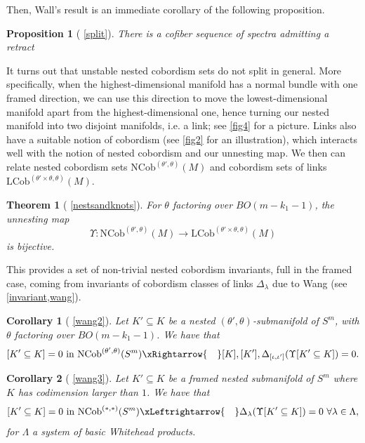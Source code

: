 \documentclass[a4paper, 11pt,reqno]{amsart}
\theoremstyle{plain}
\newtheorem*{theorem*}{Theorem}
\newtheorem*{corollary*}{Corollary}
\newtheorem*{proposition*}{Proposition}
\theoremstyle{definition}
\newcommand{\Th}{\mathrm{Th}}
\begin{document}
Then, Wall's result is an immediate corollary of the following proposition.
\begin{proposition*}[ \ref{split}] There is a cofiber sequence of spectra admitting a retract
    \begin{center}
\end{center}
\end{proposition*}
It turns out that unstable nested cobordism sets do not split in general. More specifically, when the highest-dimensional manifold has a normal bundle with one framed direction, we can use this direction to move the lowest-dimensional manifold apart from the highest-dimensional one, hence turning our nested manifold into two disjoint manifolds, i.e. a link; see \cref{fig4} for a picture. Links also have a suitable notion of cobordism (see \cref{fig2} for an illustration), which interacts well with the notion of nested cobordism and our unnesting map. We then can relate nested cobordism sets $\mathrm{NCob}^{(\theta',\theta)}(M)$ and cobordism sets of links $\mathrm{LCob}^{(\theta'\times\theta,\theta)}(M)$.
\begin{theorem*}[ \ref{nestsandknots}] For $\theta$ factoring over $BO(m-k_1-1)$, the unnesting map
\[\Upsilon\colon\mathrm{NCob}^{(\theta',\theta)}(M)\to\mathrm{LCob}^{(\theta'\times\theta,\theta)}(M)\]
is bijective.\end{theorem*}
This provides a set of non-trivial nested cobordism invariants, full in the framed case, coming from invariants of cobordism classes of links $\Delta_\lambda$ due to Wang \cite{geohilton,geohiltonthesis} (see \cref{invariant,wang}).
\begin{corollary*}[{ \ref{wang2}}] Let $K'\subseteq K$ be a nested $(\theta',\theta)$-submanifold of $S^m$, with $\theta$ factoring over $BO(m-k_1-1)$. We have that 
\[[K'\subseteq K]=0\text{ in } \mathrm{NCob}^{(\theta',\theta)}(S^m)\xRightarrow{\quad} [K],[K'],\Delta_{[\iota,\iota']}(\Upsilon[K'\subseteq K])=0.\]
\end{corollary*}
\begin{corollary*}[{ \ref{wang3}}]
Let $K'\subseteq K$ be a framed nested submanifold of $S^m$ where $K$ has codimension larger than $1$. We have that 
\[[K'\subseteq K]=0\text{ in } \mathrm{NCob}^{(\ast,\ast)}(S^m)\xLeftrightarrow{\quad}\Delta_\lambda(\Upsilon[K'\subseteq K])=0\ \forall\lambda\in\Lambda,\]
for $\Lambda$ a system of basic Whitehead products.
\end{corollary*}
\end{document}
